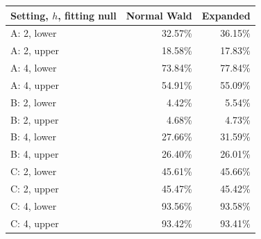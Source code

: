 \begin{tabular}{@{}lrr@{}}
\toprule
Setting, \(h\), fitting null & Normal Wald & Expanded\\
\midrule
A: 2, lower & 32.57\% & 36.15\%\\
A: 2, upper & 18.58\% & 17.83\%\\
A: 4, lower & 73.84\% & 77.84\%\\
A: 4, upper & 54.91\% & 55.09\%\\
B: 2, lower & 4.42\% & 5.54\%\\
B: 2, upper & 4.68\% & 4.73\%\\
B: 4, lower & 27.66\% & 31.59\%\\
B: 4, upper & 26.40\% & 26.01\%\\
C: 2, lower & 45.61\% & 45.66\%\\
C: 2, upper & 45.47\% & 45.42\%\\
C: 4, lower & 93.56\% & 93.58\%\\
C: 4, upper & 93.42\% & 93.41\%\\
\bottomrule
\end{tabular}
